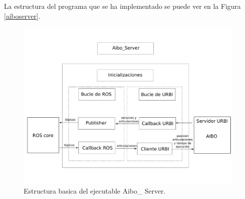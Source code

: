 \documentclass[12pt,a4paper,final,twoside]{article}
\begin{document}
La estructura del programa que se ha implementado se puede ver en la Figura \ref{aiboserver}.
\begin{figure}[H]
	\centering
    \includegraphics[scale=0.35]{images/Aibo_Server.pdf}
	 \caption{Estructura basica del ejecutable Aibo\_ Server.}
  \label{fig:aiboserver}
\end{figure}
\end{document}

